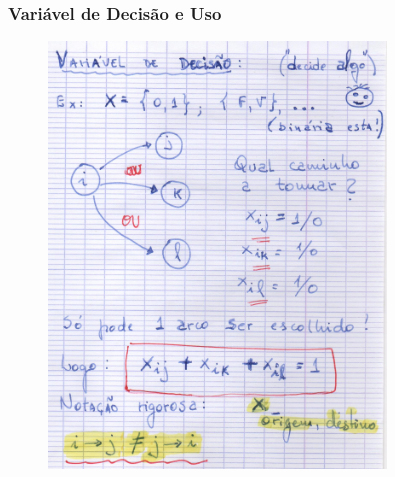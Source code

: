 \documentclass{beamer}
\begin{document}
\begin{frame}
	\frametitle{Variável de Decisão e Uso}
	
	\begin{figure}[tbp]
		\includegraphics[width=0.8\textwidth , height=0.8\textheight]{03_variavel_decisao_uso.pdf}
		\centering
	\end{figure}
\end{frame}
\end{document}
